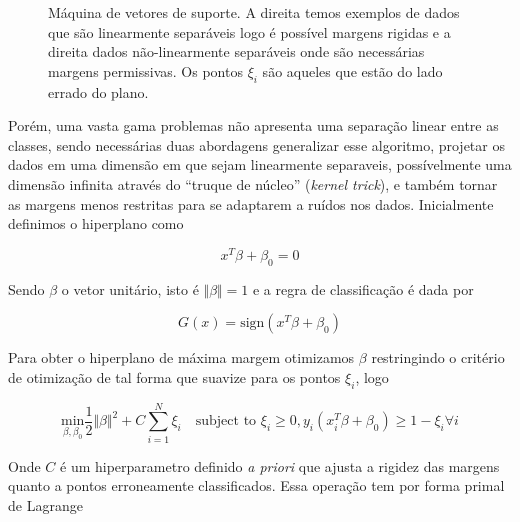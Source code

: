 \begin{figure}[ht]
   \centering
    \begin{subfigure}{.48\textwidth}
        \centering
        \def\svgwidth{\linewidth}
    \end{subfigure}
     \hfill
    \begin{subfigure}{.48\textwidth}
        \centering
        \def\svgwidth{\linewidth}
    \end{subfigure}
    \caption{Máquina de vetores de suporte. A direita temos exemplos de dados
    que são linearmente separáveis logo é possível margens rigidas e a direita
    dados não-linearmente separáveis onde são necessárias margens permissivas.
    Os pontos $\xi_i$ são aqueles que estão do lado errado do plano.}
    \label{fig:svm}
\end{figure}

Porém, uma vasta gama problemas não apresenta uma separação linear entre as
classes, sendo necessárias duas abordagens generalizar esse algoritmo, projetar
os dados em uma dimensão em que sejam linearmente separaveis, possívelmente uma
dimensão infinita através do ``truque de núcleo'' (\textit{kernel trick}), e
também tornar as margens menos restritas para se adaptarem a ruídos nos dados.
Inicialmente definimos o hiperplano como

\begin{equation}
    \label{eq:svm_func}
    x^T\beta + \beta_0 = 0
\end{equation}

Sendo $\beta$ o vetor unitário, isto é $\Vert\beta\Vert = 1$ e a regra de
classificação é dada por

\begin{equation}
    \label{eq:svm_sign}
    G(x) = \text{sign}(x^T\beta + \beta_0)
\end{equation}

Para obter o hiperplano de máxima margem otimizamos $\beta$ restringindo o
critério de otimização de tal forma que suavize para os pontos $\xi_i$, logo

\begin{equation}
    \underset{\beta,\beta_0}{\text{min}} \frac{1}{2}\Vert\beta\Vert^2 +
    C\sum_{i=1}^{N}\xi_i \hspace{1em} \text{subject to } \xi_i \geq 0,
    y_i(x_i^T\beta+\beta_0) \geq 1-\xi_i \forall i
\end{equation}

Onde $C$ é um hiperparametro definido \textit{a priori} que ajusta a rigidez
das margens quanto a pontos erroneamente classificados. Essa operação tem por
forma primal de Lagrange

